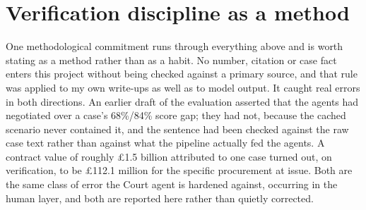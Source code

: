 \section{Verification discipline as a method}
\label{sec:verification-discipline}

One methodological commitment runs through everything above and is worth stating
as a method rather than as a habit. No number, citation or case fact enters this
project without being checked against a primary source, and that rule was applied
to my own write-ups as well as to model output. It caught real errors in both
directions. An earlier draft of the evaluation asserted that the agents had
negotiated over a case's 68\%/84\% score gap; they had not, because the cached
scenario never contained it, and the sentence had been checked against the raw
case text rather than against what the pipeline actually fed the agents. A
contract value of roughly \pounds1.5 billion attributed to one case turned out, on
verification, to be \pounds112.1 million for the specific procurement at issue.
Both are the same class of error the Court agent is hardened against, occurring in
the human layer, and both are reported here rather than quietly corrected.

